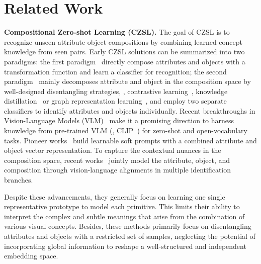 \section{Related Work}
\label{sec:related}
\noindent\textbf{Compositional Zero-shot Learning (CZSL).} The goal of CZSL is to recognize unseen attribute-object compositions by combining learned concept knowledge from seen pairs. Early CZSL solutions can be summarized into two paradigms: the first paradigm~\cite{nagarajan2018attributes,naeem2021learning,misra2017red,purushwalkam2019task,anwaar2022leveraging,mancini2022learning,khan2023learning} directly compose attributes and objects with a transformation function and learn a classifier for recognition; the second paradigm~\cite{hao2023learning,saini2022disentangling,li2022siamese,ruis2021independent,yang2020learning,atzmon2020causal,li2023distilled} mainly decomposes attribute and object in the composition space by well-designed disentangling strategies, \eg, contrastive learning~\cite{li2022siamese}, knowledge distillation~\cite{li2023distilled} or graph representation learning~\cite{ruis2021independent}, and employ two separate classifiers to identify attributes and objects individually. 
Recent breakthroughs in Vision-Language Models (VLM)~\cite{li2022blip,jia2021scaling,radford2021learning} make it a promising direction to harness knowledge from pre-trained VLM (\eg, CLIP~\cite{radford2021learning}) for zero-shot and open-vocabulary tasks. 
Pioneer works~\cite{nayaklearning,lu2023decomposed,bao2023prompting,xu2022prompting} build learnable soft prompts with a combined attribute and object vector representation.
To capture the contextual nuances in the composition space, recent works~\cite{huang2024troika,li2024context,jing2024retrieval} jointly model the attribute, object, and composition through vision-language alignments in multiple identification branches.

Despite these advancements, they generally focus on learning one single representative prototype to model each primitive. This limits their ability to interpret the complex and subtle meanings that arise from the combination of various visual concepts. 
Besides, these methods primarily focus on disentangling attributes and objects with a restricted set of samples, neglecting the potential of incorporating global information to reshape a well-structured and independent embedding space. 

